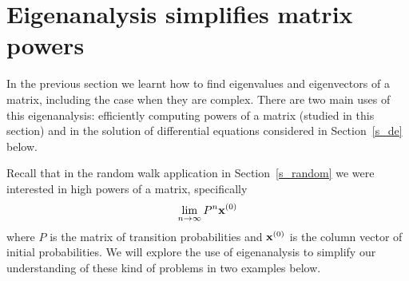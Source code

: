 \section{Eigenanalysis simplifies matrix powers}

In the previous section we learnt how to find eigenvalues and
eigenvectors of a matrix, including the case when they are
complex. There are two main uses of this eigenanalysis: efficiently
computing powers of a matrix (studied in this section) and in the
solution of differential equations considered in Section~\ref{s_de}
below. 

Recall that in the random walk application in Section~\ref{s_random}
we were interested in high powers of a matrix, specifically
\[
\lim_{n \rightarrow \infty} P^n {\bf x}^{(0)}
\]
where $P$ is the matrix of transition probabilities and ${\bf x}^{(0)}$ is
the column vector of initial probabilities. We will explore the use of
eigenanalysis to simplify our understanding of these kind of
problems in two examples below. 

